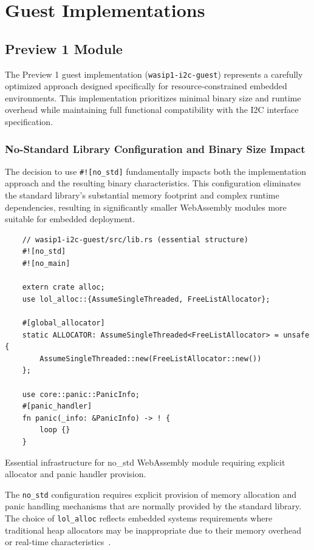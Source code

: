 \section{Guest Implementations}
\label{sec:guest-implementations}

\subsection{Preview 1 Module}

The Preview 1 guest implementation (\texttt{wasip1-i2c-guest}) represents a carefully optimized approach designed specifically for resource-constrained embedded environments. This implementation prioritizes minimal binary size and runtime overhead while maintaining full functional compatibility with the I2C interface specification.

\subsubsection{No-Standard Library Configuration and Binary Size Impact}

The decision to use \texttt{\#![no\_std]} fundamentally impacts both the implementation approach and the resulting binary characteristics. This configuration eliminates the standard library's substantial memory footprint and complex runtime dependencies, resulting in significantly smaller WebAssembly modules more suitable for embedded deployment.

\begin{listing}[H]
    \begin{verbatim}
    // wasip1-i2c-guest/src/lib.rs (essential structure)
    #![no_std]
    #![no_main]
        
    extern crate alloc;
    use lol_alloc::{AssumeSingleThreaded, FreeListAllocator};
    
    #[global_allocator]
    static ALLOCATOR: AssumeSingleThreaded<FreeListAllocator> = unsafe {
        AssumeSingleThreaded::new(FreeListAllocator::new())
    };
    
    use core::panic::PanicInfo;
    #[panic_handler]
    fn panic(_info: &PanicInfo) -> ! {
        loop {}
    }
    \end{verbatim}
    \caption{Essential infrastructure for no\_std WebAssembly module requiring explicit allocator and panic handler provision.}
    \label{lst:no-std-infrastructure}
\end{listing}

The \texttt{no\_std} configuration requires explicit provision of memory allocation and panic handling mechanisms that are normally provided by the standard library. The choice of \texttt{lol\_alloc} reflects embedded systems requirements where traditional heap allocators may be inappropriate due to their memory overhead or real-time characteristics~\cite{lol_alloc_git}.

